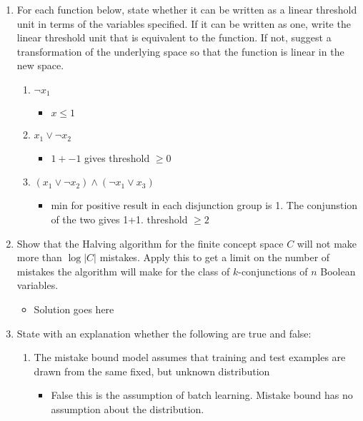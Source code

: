 \documentclass{article}
\begin{document}
\begin{enumerate}
\item For each function below, state whether it can be written as a linear threshold unit in terms of the variables specified. If it can be written as one, write the linear threshold unit that is equivalent to the function. If not, suggest a transformation of the underlying space so that the function is linear in the new space.

	\begin{enumerate}
	\item $\neg x_{1}$
		\begin{itemize}
		\item $x\leq 1$
		\end{itemize}

	\item $x_{1}\vee \neg x_{2}$
		\begin{itemize}
		\item $1+-1$ gives threshold $\geq 0$
		\end{itemize}

	\item $(x_{1}\vee \neg x_{2})\wedge (\neg x_{1} \vee x_{3})$
		\begin{itemize}
		\item min for positive result in each disjunction group is 1. The conjunstion of the two gives 1+1. threshold $\geq 2$
		\end{itemize}

	\end{enumerate}

\item Show that the Halving algorithm for the finite concept space $C$ will not make more than $\log\left| C\right|$ mistakes. Apply this to get a limit on the number of mistakes the algorithm will make for the class of $k$-conjunctions of $n$ Boolean variables.


	\begin{itemize}
	\item Solution goes here
	\end{itemize}



\item State with an explanation whether the following are true and false:
	\begin{enumerate}
	\item The mistake bound model assumes that training and test examples are drawn from the same fixed, but unknown distribution
		\begin{itemize}
		\item False this is the assumption of batch learning. Mistake bound has no assumption about the distribution.
		\end{itemize}


\end{enumerate}
\end{enumerate}
\end{document}
